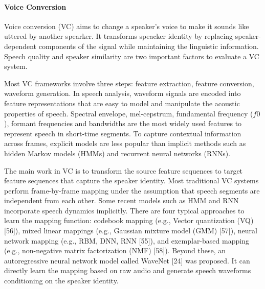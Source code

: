 \documentclass{article}
\begin{document}
\paragraph{Voice Conversion}
Voice conversion (VC) aims to change a speaker's voice to make it sounds like uttered by another spearker. It transforms speacker identity by replacing speaker-dependent components of the signal while maintaining the linguistic information. Speech quality and speaker similarity are two important factors to evaluate a VC system. 

Most VC frameworks involve three steps: feature extraction, feature conversion, waveform generation. In speech analysis, waveform signals are encoded into feature representations that are easy to model and manipulate the acoustic properties of speech. Spectral envelope, mel-cepstrum, fundamental frequency ($f0$), formant frequencies and bandwidths are the most widely used features to represent speech in short-time segments. To capture contextual information across frames, explicit models are less popular than implicit methods such as hidden Markov models (HMMs) and recurrent neural networks (RNNs). 

The main work in VC is to transform the source feature sequences to target feature sequences that capture the speaker identity. Most traditional VC systems perform frame-by-frame mapping under the assumption that speech segments are independent from each other. Some recent models such as HMM and RNN incorporate speech dynamics implicitly. There are four typical approaches to learn the mapping function: codebook mapping (e.g., Vector quantization (VQ) [56]), mixed linear mappings (e.g., Gaussian mixture model (GMM) [57]), neural network mapping (e.g., RBM, DNN, RNN [55]), and exemplar-based mapping (e.g., non-negative matrix factorization (NMF) [58]). Beyond these, an autoregressive neural network model called WaveNet [24] was proposed. It can directly learn the mapping based on raw audio and generate speech waveforms conditioning on the speaker identity.
\end{document}
